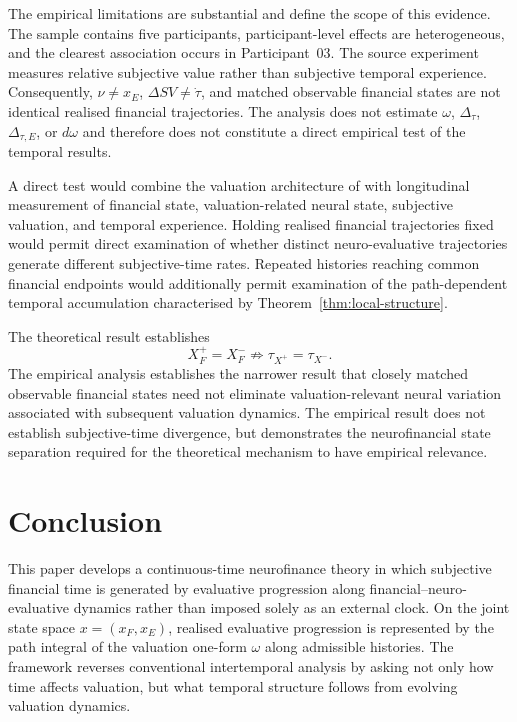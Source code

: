 \documentclass[graybox,natbib]{SNmult}
\providecommand{\1}{}
\renewcommand{\1}{\mathbbm 1}
\begin{document}
The empirical limitations are substantial and define the scope of this
evidence. The sample contains five participants, participant-level effects are
heterogeneous, and the clearest association occurs in Participant~03. The
source experiment measures relative subjective value rather than subjective
temporal experience. Consequently, \(\nu\neq x_E\),
\(\Delta SV\neq\dot\tau\), and matched observable financial states are not
identical realised financial trajectories. The analysis does not estimate
\(\omega\), \(\Delta_\tau\), \(\Delta_{\tau,E}\), or \(d\omega\) and therefore
does not constitute a direct empirical test of the temporal results.

A direct test would combine the valuation architecture of
\citet{PivaEtAl2019} with longitudinal measurement of financial state,
valuation-related neural state, subjective valuation, and temporal experience.
Holding realised financial trajectories fixed would permit direct examination
of whether distinct neuro-evaluative trajectories generate different
subjective-time rates. Repeated histories reaching common financial endpoints
would additionally permit examination of the path-dependent temporal
accumulation characterised by Theorem~\ref{thm:local-structure}.

The theoretical result establishes
\[
X_F^+=X_F^-
\not\Rightarrow
\tau_{X^+}=\tau_{X^-}.
\]
The empirical analysis establishes the narrower result that closely matched
observable financial states need not eliminate valuation-relevant neural
variation associated with subsequent valuation dynamics. The empirical result
does not establish subjective-time divergence, but demonstrates the
neurofinancial state separation required for the theoretical mechanism to have
empirical relevance.





\section{Conclusion}
\label{sec:conclusion}

This paper develops a continuous-time neurofinance theory in which subjective
financial time is generated by evaluative progression along
financial--neuro-evaluative dynamics rather than imposed solely as an external
clock. On the joint state space \(x=(x_F,x_E)\), realised evaluative
progression is represented by the path integral of the valuation one-form
\(\omega\) along admissible histories. The framework reverses conventional
intertemporal analysis by asking not only how time affects valuation, but what
temporal structure follows from evolving valuation dynamics.
\end{document}
